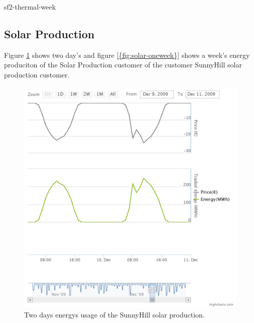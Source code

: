 sf2-thermal-week

\subsection{Solar Production}
Figure \ref{fig:solar-twoday} shows two day's and  figure \ref{{fig:solar-oneweek}} shows a week's energy produciton of the Solar Production customer of the customer SunnyHill solar production customer.

\begin{figure}[h!]
  \includegraphics[width=\linewidth]{sunnyhill-twoday.png}
  \caption{Two days energys usage of the SunnyHill solar production.}
  \label{fig:solar-twoday}
\end{figure}


